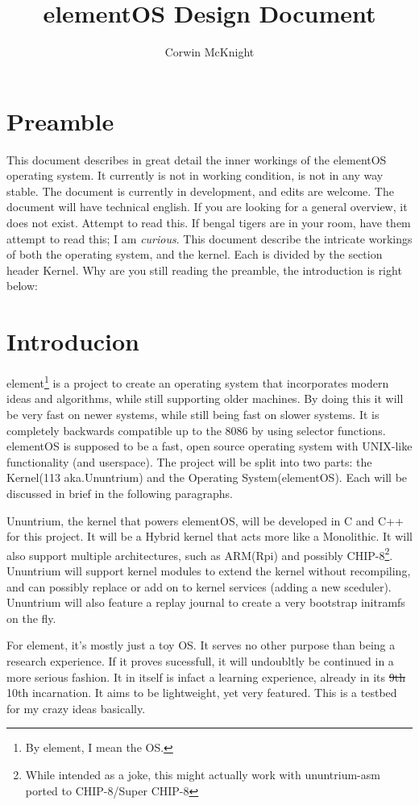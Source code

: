 \documentclass[12pt]{article}
\title{elementOS Design Document}
\author{Corwin McKnight}
\begin{document}
\maketitle
\tableofcontents
\clearpage
\section{Preamble}
This document describes in great detail the inner workings of the elementOS operating system. It currently is not in working condition, is not in any way stable. The document is currently in development, and edits are welcome. The document will have technical english. If you are looking for a general overview, it does not exist. Attempt to read this. If bengal tigers are in your room, have them attempt to read this; I am \emph{curious}. This document describe the intricate workings of both the operating system, and the kernel. Each is divided by the section header Kernel. Why are you still reading the preamble, the introduction is right below:

\section{Introducion}
element\footnote{By element, I mean the OS.} is a project to create an operating system that incorporates modern ideas and algorithms, while still supporting older machines. By doing this it will be very fast on newer systems, while still being fast on slower systems. It is completely backwards compatible up to the 8086 by using selector functions. elementOS is supposed to be a fast, open source operating system with UNIX-like functionality (and userspace). The project will be split into two parts: the Kernel(113 aka.Ununtrium) and the Operating System(elementOS). Each will be discussed in brief in the following paragraphs.

Ununtrium, the kernel that powers elementOS, will be developed in C and C++ for this project. It will be a Hybrid kernel that acts more like a Monolithic. It will also support multiple architectures, such as ARM(Rpi) and possibly CHIP-8\footnote{While intended as a joke, this might actually work with ununtrium-asm ported to CHIP-8/Super CHIP-8}. Ununtrium will support kernel modules to extend the kernel without recompiling, and can possibly replace or add on to kernel services (adding a new sceduler). Ununtrium will also feature a replay journal to create a very bootstrap initramfs on the fly.

For element, it's mostly just a toy OS. It serves no other purpose than being a research experience. If it proves sucessfull, it will undoubltly be continued in a more serious fashion. It in itself is infact a learning experience, already in its \sout{9th} 10th incarnation. It aims to be lightweight, yet very featured. This is a testbed for my crazy ideas basically.
\end{document}
